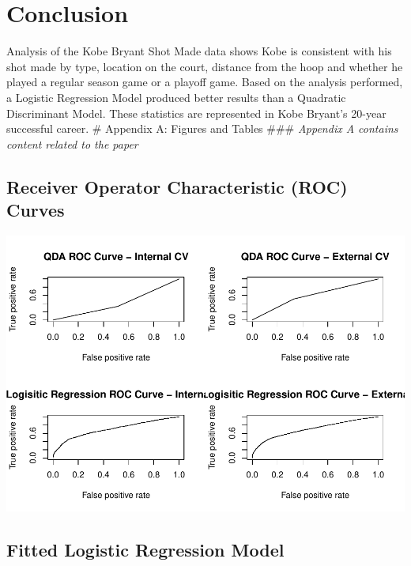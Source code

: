\documentclass[american,]{article}
\begin{document}
\hypertarget{conclusion}{%
\section{\texorpdfstring{\textbf{Conclusion}}{Conclusion}}\label{conclusion}}

Analysis of the Kobe Bryant Shot Made data shows Kobe is consistent with his shot made by type, location on the court, distance from the hoop and whether he played a regular season game or a playoff game. Based on the analysis performed, a Logistic Regression Model produced better results than a Quadratic Discriminant Model. These statistics are represented in Kobe Bryant's 20-year successful career.
\newpage
\# Appendix A: Figures and Tables
\#\#\# \emph{Appendix A contains content related to the paper}

\hypertarget{receiver-operator-characteristic-roc-curves}{%
\subsection{\texorpdfstring{\textbf{Receiver Operator Characteristic (ROC) Curves}}{Receiver Operator Characteristic (ROC) Curves}}\label{receiver-operator-characteristic-roc-curves}}

\begin{center}\includegraphics{Final_Project_Applied_files/figure-latex/ROC curves-1} \end{center}

\hypertarget{fitted-logistic-regression-model}{%
\subsection{\texorpdfstring{\textbf{Fitted Logistic Regression Model}}{Fitted Logistic Regression Model}}\label{fitted-logistic-regression-model}}
\end{document}
